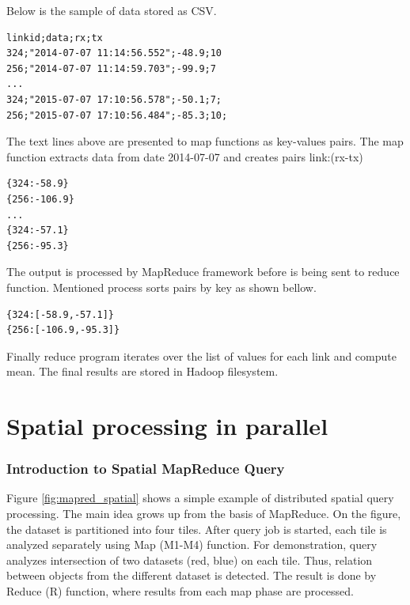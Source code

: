 \documentclass[a4paper,12pt,oneside]{report}
\begin{document}
	Below is the sample of data stored as CSV.
	\begin{footnotesize}
		\begin{lstlisting}[style=mybash]
linkid;data;rx;tx
324;"2014-07-07 11:14:56.552";-48.9;10
256;"2014-07-07 11:14:59.703";-99.9;7
...
324;"2015-07-07 17:10:56.578";-50.1;7;
256;"2015-07-07 17:10:56.484";-85.3;10;
		\end{lstlisting}
	\end{footnotesize}
	The text lines above are presented to map functions as key-values pairs.
	The map function extracts data from date 2014-07-07 and creates pairs
	{link:(rx-tx)}
	\begin{footnotesize}
		\begin{lstlisting}[style=mybash]
{324:-58.9}
{256:-106.9}
...
{324:-57.1}
{256:-95.3}
		\end{lstlisting}
	\end{footnotesize}
	The output is processed by MapReduce framework before is being sent to reduce
	function.
	Mentioned process sorts pairs by key as shown bellow.
	\begin{footnotesize}
		\begin{lstlisting}[style=mybash]
{324:[-58.9,-57.1]}
{256:[-106.9,-95.3]}
		\end{lstlisting}\end{footnotesize}
	Finally reduce program iterates over the list of values for each link and
	compute mean.
	The final results are stored in Hadoop filesystem.
	
	
	
	\section{Spatial processing in parallel}
	\subsubsection{Introduction to Spatial MapReduce Query}
	Figure \ref{fig:mapred_spatial} shows a simple example of distributed spatial
	query processing. The main idea 
	grows up from the basis of MapReduce. On the figure, the dataset is partitioned
	into four tiles. After 
	query job is started, each tile is analyzed separately using Map (M1-M4)
	function. For demonstration, 
	query analyzes intersection of two datasets (red, blue) on each tile. Thus,
	relation between 
	objects from the different dataset is detected. The result is done by Reduce (R)
	function, where results from each
	map phase are processed.
	
\end{document}
